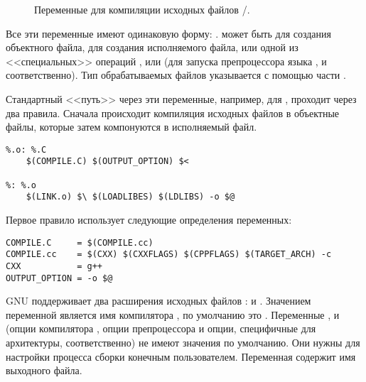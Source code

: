 \begin{figure}[!ht]
\centering

\caption{Переменные для компиляции исходных файлов
\Clang{}/\Cplusplus{}.} \label{fig:vars_for_c_comp}
\end{figure}

Все эти переменные имеют одинаковую форму:
.  может быть
 для создания объектного файла,  для
создания исполняемого файла, или одной из <<специальных>> операций
,  или  (для запуска
препроцессора языка \Clang{},  и 
соответственно). Тип обрабатываемых файлов указывается с помощью части
.

Стандартный <<путь>> через эти переменные, например, для \Cplusplus{},
проходит через два правила. Сначала происходит компиляция исходных
файлов \Cplusplus{} в объектные файлы, которые затем компонуются в
исполняемый файл.

{\footnotesize
\begin{verbatim}
%.o: %.C
    $(COMPILE.C) $(OUTPUT_OPTION) $<

%: %.o
    $(LINK.o) $\ $(LOADLIBES) $(LDLIBS) -o $@
\end{verbatim}
}

Первое правило использует следующие определения переменных:

{\footnotesize
\begin{verbatim}
COMPILE.C     = $(COMPILE.cc)
COMPILE.cc    = $(CXX) $(CXXFLAGS) $(CPPFLAGS) $(TARGET_ARCH) -c
CXX           = g++
OUTPUT_OPTION = -o $@
\end{verbatim}
}

GNU \GNUmake{} поддерживает два расширения исходных файлов
\Cplusplus{}:  и . Значением переменной
 является имя компилятора \Cplusplus{}, по умолчанию это
. Переменные ,  и
 (опции компилятора \Cplusplus{}, опции
препроцессора \Clang{} и опции, специфичные для архитектуры,
соответственно) не имеют значения по умолчанию. Они нужны для
настройки процесса сборки конечным пользователем. Переменная
 содержит имя выходного файла.

